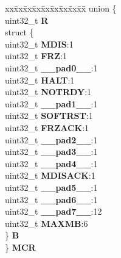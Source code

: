 \begin{DoxyCompactItemize}
\item 
\mbox{\label{structFLEXCAN2__tag_a300f6e334e43496d612ef0e295bb51e1}} 
\begin{tabbing}
xx\=xx\=xx\=xx\=xx\=xx\=xx\=xx\=xx\=\kill
union \{\\
\>uint32\_t {\bfseries R}\\
\>struct \{\\
\>\>uint32\_t {\bfseries MDIS}:1\\
\>\>uint32\_t {\bfseries FRZ}:1\\
\>\>uint32\_t {\bfseries \_\_pad0\_\_}:1\\
\>\>uint32\_t {\bfseries HALT}:1\\
\>\>uint32\_t {\bfseries NOTRDY}:1\\
\>\>uint32\_t {\bfseries \_\_pad1\_\_}:1\\
\>\>uint32\_t {\bfseries SOFTRST}:1\\
\>\>uint32\_t {\bfseries FRZACK}:1\\
\>\>uint32\_t {\bfseries \_\_pad2\_\_}:1\\
\>\>uint32\_t {\bfseries \_\_pad3\_\_}:1\\
\>\>uint32\_t {\bfseries \_\_pad4\_\_}:1\\
\>\>uint32\_t {\bfseries MDISACK}:1\\
\>\>uint32\_t {\bfseries \_\_pad5\_\_}:1\\
\>\>uint32\_t {\bfseries \_\_pad6\_\_}:1\\
\>\>uint32\_t {\bfseries \_\_pad7\_\_}:12\\
\>\>uint32\_t {\bfseries MAXMB}:6\\
\>\} {\bfseries B}\\
\} {\bfseries MCR}\\


\end{tabbing}
\end{DoxyCompactItemize}
